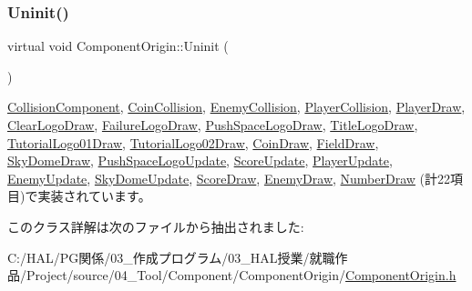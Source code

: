 \mbox{\label{class_component_origin_a9f89a93f9c1954bd53f9750e35e6089d}} 
\subsubsection{\texorpdfstring{Uninit()}{Uninit()}}
{\footnotesize\ttfamily virtual void Component\+Origin\+::\+Uninit (\begin{DoxyParamCaption}{ }\end{DoxyParamCaption})\hspace{0.3cm}{\ttfamily [pure virtual]}}



\mbox{\hyperlink{class_collision_component_aa75440061f7a60e8c4ee1dae18682cc0}{Collision\+Component}}, \mbox{\hyperlink{class_coin_collision_aa852afdcdbedcf82809df9c7fd99be9e}{Coin\+Collision}}, \mbox{\hyperlink{class_enemy_collision_a2a194c606fd162db803c70c6fed9b9e4}{Enemy\+Collision}}, \mbox{\hyperlink{class_player_collision_aa1ab60a62fa2ae3231a1ea0bc8faf801}{Player\+Collision}}, \mbox{\hyperlink{class_player_draw_a917b2947914287f23d87ca75cd68f553}{Player\+Draw}}, \mbox{\hyperlink{class_clear_logo_draw_aa73db5b701e644f8e552ddb254a0a9aa}{Clear\+Logo\+Draw}}, \mbox{\hyperlink{class_failure_logo_draw_a97646253380b54f37565650e211f33cd}{Failure\+Logo\+Draw}}, \mbox{\hyperlink{class_push_space_logo_draw_a79021c1df43968d6008de74126d53fba}{Push\+Space\+Logo\+Draw}}, \mbox{\hyperlink{class_title_logo_draw_a07bbf9e8de5c7b9ee028408496c13c50}{Title\+Logo\+Draw}}, \mbox{\hyperlink{class_tutorial_logo01_draw_ab27500ea1511726097dc9f81cefb9632}{Tutorial\+Logo01\+Draw}}, \mbox{\hyperlink{class_tutorial_logo02_draw_a9eec09783781876d354c51d4f2acf2cd}{Tutorial\+Logo02\+Draw}}, \mbox{\hyperlink{class_coin_draw_a6484c22a5598e298f18e7cd6083cd551}{Coin\+Draw}}, \mbox{\hyperlink{class_field_draw_a89a78212c141714d9e39e25e663aaeff}{Field\+Draw}}, \mbox{\hyperlink{class_sky_dome_draw_aee1c6b102a97033073b2559b8c2c328b}{Sky\+Dome\+Draw}}, \mbox{\hyperlink{class_push_space_logo_update_a94f791874cb6160cd33cd7068fcde0d0}{Push\+Space\+Logo\+Update}}, \mbox{\hyperlink{class_score_update_a701d9c84c3ef92b1c54f33b37e23605f}{Score\+Update}}, \mbox{\hyperlink{class_player_update_a997e0813a825d7525da4b5b89a290168}{Player\+Update}}, \mbox{\hyperlink{class_enemy_update_a294a5d4c65551af43e933cb65036f279}{Enemy\+Update}}, \mbox{\hyperlink{class_sky_dome_update_a54da74ef017a22075ce473abe1345489}{Sky\+Dome\+Update}}, \mbox{\hyperlink{class_score_draw_aad744f8a7a1202e6ba8117c660f297ee}{Score\+Draw}}, \mbox{\hyperlink{class_enemy_draw_a2861dc0623b0be7726bc69a6a469190e}{Enemy\+Draw}}, \mbox{\hyperlink{class_number_draw_a2b203d101f23f0d3f584937ff5ad662a}{Number\+Draw}} (計22項目)で実装されています。



このクラス詳解は次のファイルから抽出されました\+:\begin{DoxyCompactItemize}
\item 
C\+:/\+H\+A\+L/\+P\+G関係/03\+\_\+作成プログラム/03\+\_\+\+H\+A\+L授業/就職作品/\+Project/source/04\+\_\+\+Tool/\+Component/\+Component\+Origin/\mbox{\hyperlink{_component_origin_8h}{Component\+Origin.\+h}}\end{DoxyCompactItemize}
